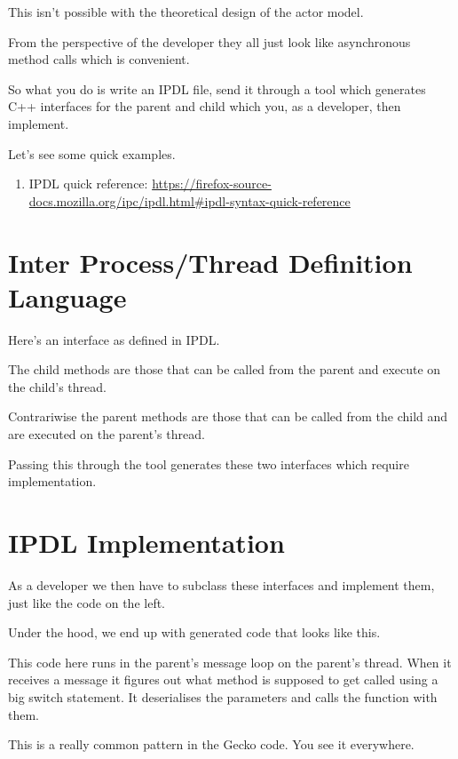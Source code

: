\documentclass{article}
\begin{document}
This isn't possible with the theoretical design of the actor model.

From the perspective of the developer they all just look like asynchronous method calls which is convenient.

So what you do is write an IPDL file, send it through a tool which generates C++ interfaces for the parent and child which you, as a developer, then implement.

Let's see some quick examples.

\begin{enumerate}
\item IPDL quick reference: \url{https://firefox-source-docs.mozilla.org/ipc/ipdl.html\#ipdl-syntax-quick-reference}
\end{enumerate}


\section{Inter Process/Thread Definition Language}

Here's an interface as defined in IPDL.

The {\code child} methods are those that can be called from the parent and execute on the child's thread.

Contrariwise the {\code parent} methods are those that can be called from the child and are executed on the parent's thread.

Passing this through the tool generates these two interfaces which require implementation.


\section{IPDL Implementation}

As a developer we then have to subclass these interfaces and implement them, just like the code on the left.

Under the hood, we end up with generated code that looks like this.

This code here runs in the parent's message loop on the parent's thread. When it receives a message it figures out what method is supposed to get called using a big {\code switch} statement. It deserialises the parameters and calls the function with them.

This is a really common pattern in the Gecko code. You see it everywhere.
\end{document}
